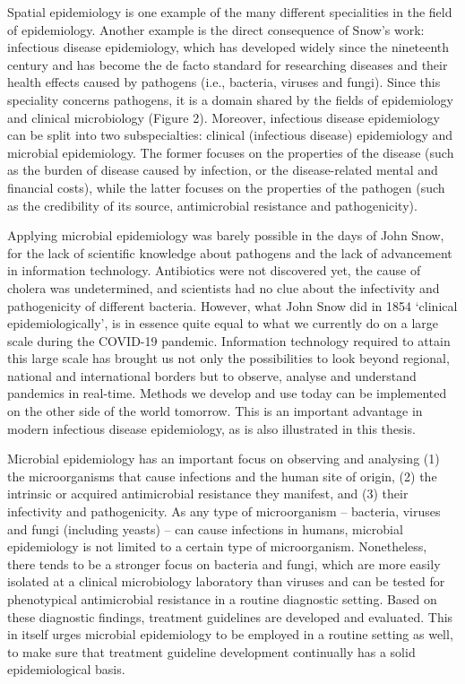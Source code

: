 \documentclass[
]{book}
\begin{document}
Spatial epidemiology is one example of the many different specialities in the field of epidemiology. Another example is the direct consequence of Snow's work: infectious disease epidemiology, which has developed widely since the nineteenth century and has become the de facto standard for researching diseases and their health effects caused by pathogens (i.e., bacteria, viruses and fungi). Since this speciality concerns pathogens, it is a domain shared by the fields of epidemiology and clinical microbiology (Figure 2). Moreover, infectious disease epidemiology can be split into two subspecialties: clinical (infectious disease) epidemiology and microbial epidemiology. The former focuses on the properties of the disease (such as the burden of disease caused by infection, or the disease-related mental and financial costs), while the latter focuses on the properties of the pathogen (such as the credibility of its source, antimicrobial resistance and pathogenicity).

Applying microbial epidemiology was barely possible in the days of John Snow, for the lack of scientific knowledge about pathogens and the lack of advancement in information technology. Antibiotics were not discovered yet, the cause of cholera was undetermined, and scientists had no clue about the infectivity and pathogenicity of different bacteria. However, what John Snow did in 1854 `clinical epidemiologically', is in essence quite equal to what we currently do on a large scale during the COVID-19 pandemic. Information technology required to attain this large scale has brought us not only the possibilities to look beyond regional, national and international borders but to observe, analyse and understand pandemics in real-time. Methods we develop and use today can be implemented on the other side of the world tomorrow. This is an important advantage in modern infectious disease epidemiology, as is also illustrated in this thesis.

Microbial epidemiology has an important focus on observing and analysing (1) the microorganisms that cause infections and the human site of origin, (2) the intrinsic or acquired antimicrobial resistance they manifest, and (3) their infectivity and pathogenicity. As any type of microorganism -- bacteria, viruses and fungi (including yeasts) -- can cause infections in humans, microbial epidemiology is not limited to a certain type of microorganism. Nonetheless, there tends to be a stronger focus on bacteria and fungi, which are more easily isolated at a clinical microbiology laboratory than viruses and can be tested for phenotypical antimicrobial resistance in a routine diagnostic setting. Based on these diagnostic findings, treatment guidelines are developed and evaluated. This in itself urges microbial epidemiology to be employed in a routine setting as well, to make sure that treatment guideline development continually has a solid epidemiological basis.
\end{document}
